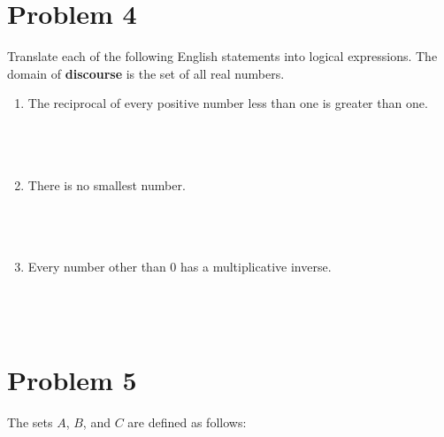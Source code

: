 \documentclass{amsart}
\theoremstyle{definition}
\theoremstyle{Exercise}
\theoremstyle{remark}
\theoremstyle{rule}
\numberwithin{equation}{section}
\begin{document}
\newpage


\section*{Problem 4}

Translate each of the following English statements into logical expressions. The domain of {\bf discourse} is the set of all real numbers.\\
\begin{enumerate}[label=(\alph*)]

\item The reciprocal of every positive number less than one is greater than one.\\\\
\\\\
\item There is no smallest number.\\\\
\\\\

\item Every number other than 0 has a multiplicative inverse.\\\\
\\\\
\end{enumerate}



 \newpage


\section*{Problem 5}
The sets $A$, $B$, and $C$ are defined as follows:\\
\end{document}
